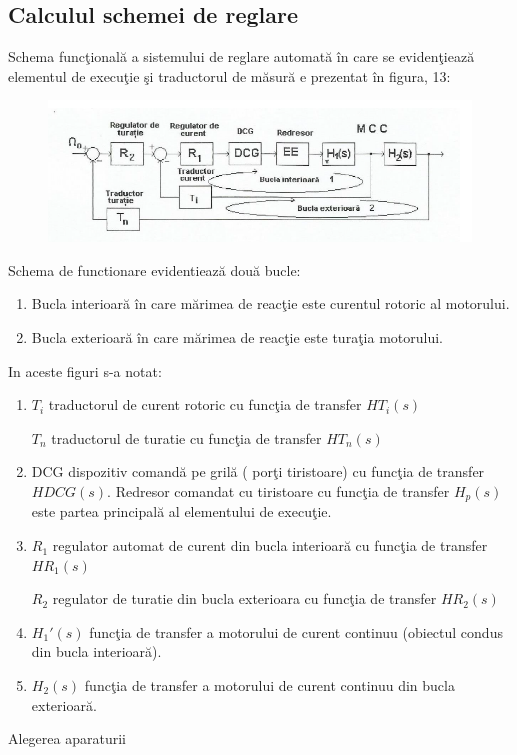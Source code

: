 \documentclass[11pt]{article}
\begin{document}
\subsection{Calculul schemei de reglare}
Schema funcţională a sistemului de reglare automată în care se evidenţiează elementul de execuţie şi traductorul de măsură e prezentat în figura, 13:
\begin{figure}[H]
	\centering
	\includegraphics[width=.9\linewidth]{fig14.png}
	\label{fig:test2}
\end{figure}
Schema de functionare evidentiează două bucle:
\begin{enumerate}
	\item Bucla interioară în care mărimea de reacţie este curentul rotoric al motorului.
	\item Bucla exterioară în care mărimea de reacţie este turaţia motorului.
\end{enumerate}
In aceste figuri s-a notat:
\begin{enumerate}[label=$\bullet$]
	\item $T_i$ traductorul de curent rotoric cu funcţia de transfer $HT_i(s)$
	
	 $T_n$ traductorul de turatie cu funcţia de transfer $HT_n(s)$
	\item DCG dispozitiv comandă pe grilă ( porţi tiristoare) cu funcţia de transfer $H DCG (s)$. Redresor comandat cu tiristoare cu funcţia de transfer $H_p(s)$ este partea principală al elementului de execuţie.
	\item $R_1$ regulator automat de curent din bucla interioară cu funcţia de transfer $HR_1(s)$
	
	 $R_2$ regulator de turatie din bucla exterioara cu funcţia de transfer $HR_2(s)$
	\item $H_1' (s)$ funcţia de transfer a motorului de curent continuu (obiectul condus din bucla interioară).
	\item $H_2 (s)$ funcţia de transfer a motorului de curent continuu din bucla exterioară.
\end{enumerate}
Alegerea aparaturii
\end{document}
